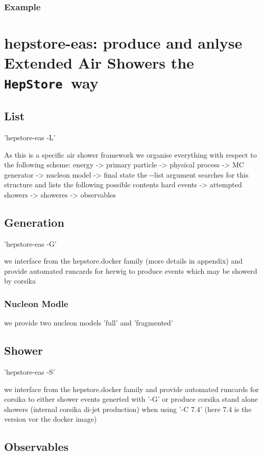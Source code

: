 \documentclass[aps,prd,11pt,tightenlines,superscriptaddress,nofootinbib,preprintnumbers,notitlepage]{revtex4-1}
\newcommand{\hepstore}{\texttt{HepStore}}
\begin{document}
\subsubsection{Example}

\section{hepstore-eas: produce and anlyse Extended Air Showers the \hepstore~way}

\subsection{List}
'hepstore-eas -L'

As this is a specific air shower framework we organise everything with respect to the following scheme: energy -> primary particle -> physical process -> MC generator -> nucleon model -> final state
the -{}-list argument searches for this structure and lists the following possible contents
hard events -> attempted showers -> showeres -> observables

\subsection{Generation}

'hepstore-eas -G'

we interface from the hepstore.docker family (more details in appendix) and provide automated runcards for herwig to produce events which may be showerd by corsika

\subsubsection{Nucleon Modle}

we provide two nucleon models 'full' and 'fragmented'

\subsection{Shower}

'hepstore-eas -S'

we interface from the hepstore.docker family and provide automated runcards for corsika to either shower events generted with '-G' or produce corsika stand alone showers (internal corsika di-jet production) when using '-C 7.4' (here 7.4 is the version vor the docker image)

\subsection{Observables}
\end{document}

